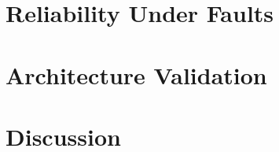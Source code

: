 \section{Reliability Under Faults}
\label{sec:char-faults}

\section{Architecture Validation}
\label{sec:char-dualcore}

\section{Discussion}
\label{sec:char-discussion}
